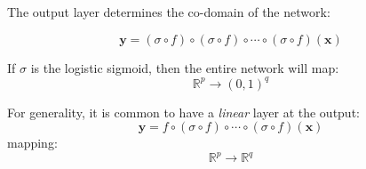 

The output layer determines the co-domain of the network:

\begin{equation} 
    \mathbf{y}= (\sigma \circ f) \circ (\sigma \circ f) \circ \cdots \circ (\sigma \circ  f) (\mathbf{x}) 
\end{equation}

If $\sigma$ is the logistic sigmoid, then the entire network will map:
\begin{equation} 
\mathbb{R}^p \to (0,1)^{q}
\end{equation}

For  generality, it is common to have a \emph{linear} layer at the output:
\begin{equation}
    \mathbf{y}= f \circ (\sigma \circ f) \circ \cdots \circ (\sigma \circ  f) (\mathbf{x}) 
\end{equation}
mapping:
\begin{equation}
    \mathbb{R}^p \to \mathbb{R}^{q}
\end{equation}